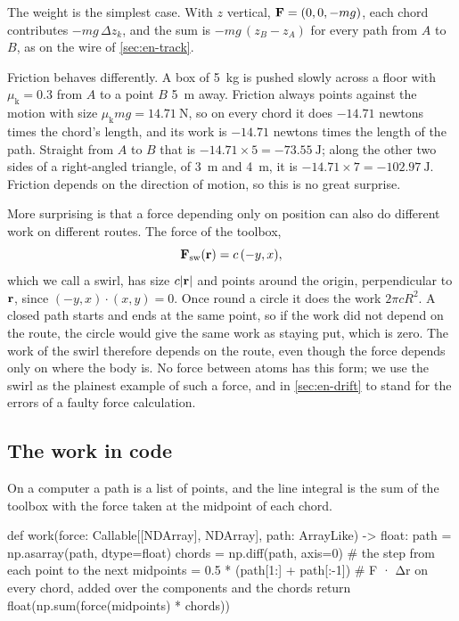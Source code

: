 The weight is the simplest case. With $z$ vertical, $\bm{\mathrm{F}} = (0, 0,
-mg)$, each chord contributes $-mg\,\Delta z_k$, and the sum is $-mg\,(z_B
- z_A)$ for every path from $A$ to $B$, as on the wire of
\cref{sec:en-track}.

Friction behaves differently. A box of \SI{5}{\kilogram} is pushed slowly
across a floor with $\mu_{\mathrm{k}} = 0.3$ from $A$ to a point $B$
\SI{5}{\metre} away. Friction always points against the motion with size
$\mu_{\mathrm{k}}mg = \SI{14.71}{\newton}$, so on every chord it does
$-14.71$ newtons times the chord's length, and its work is $-14.71$
newtons times the length of the path. Straight from $A$ to $B$ that is
$-14.71\times5 = \SI{-73.55}{\joule}$; along the other two sides of a
right-angled triangle, of \SI{3}{\metre} and \SI{4}{\metre}, it is
$-14.71\times7 = \SI{-102.97}{\joule}$. Friction depends on the direction of motion, so
this is no great surprise.

More surprising is that a force depending only on position can also do
different work on different routes. The force of the toolbox,
\begin{equation}
   \bm{\mathrm{F}}_{\mathrm{sw}}(\bm{\mathrm{r}}) = c\,(-y, x) ,
   \label{eq:en-swirl}
\end{equation}
which we call a swirl, has size $c\lvert\bm{\mathrm{r}}\rvert$ and points around
the origin, perpendicular to $\bm{\mathrm{r}}$, since $(-y, x)\cdot(x, y) = 0$.
Once round a circle it does the work $2\pi cR^2$. A closed path starts and
ends at the same point, so if the work did not depend on the route, the
circle would give the same work as staying put, which is zero. The work of
the swirl therefore depends on the route, even though the force depends
only on where the body is. No force between atoms has this form; we use the
swirl as the plainest example of such a force, and in \cref{sec:en-drift}
to stand for the errors of a faulty force calculation.

\subsection*{The work in code}

On a computer a path is a list of points, and the line integral is the
sum of the toolbox with the force taken at the midpoint of each chord.

\begin{code}
def work(force: Callable[[NDArray], NDArray], path: ArrayLike) -> float:
    path = np.asarray(path, dtype=float)
    chords = np.diff(path, axis=0)  # the step from each point to the next
    midpoints = 0.5 * (path[1:] + path[:-1])
    # F · Δr on every chord, added over the components and the chords
    return float(np.sum(force(midpoints) * chords))
\end{code}

